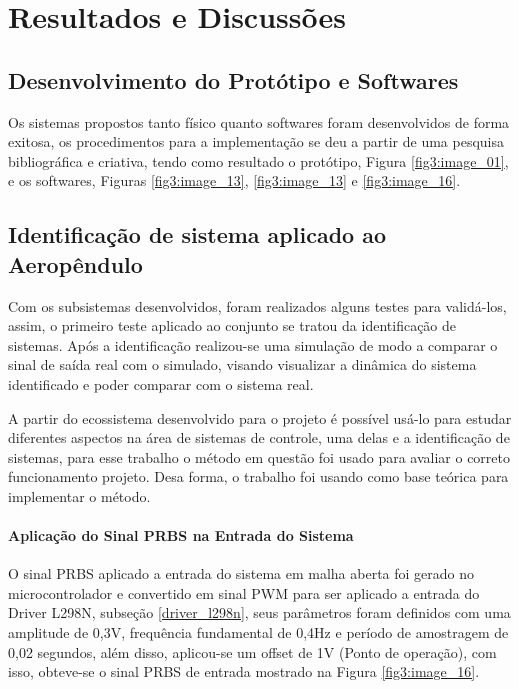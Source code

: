 \chapter{Resultados e Discussões}
\label{cap_3}

\section{Desenvolvimento do Protótipo e Softwares}

Os sistemas propostos tanto físico quanto softwares foram desenvolvidos de forma exitosa, os procedimentos para a implementação se deu a partir de uma pesquisa bibliográfica e criativa, tendo como resultado o protótipo, Figura \ref{fig3:image_01}, e os softwares, Figuras \ref{fig3:image_13}, \ref{fig3:image_13} e \ref{fig3:image_16}.


\section{Identificação de sistema aplicado ao Aeropêndulo}
\label{indentificacao}

Com os subsistemas desenvolvidos, foram realizados alguns testes para validá-los, assim, o primeiro teste aplicado ao conjunto se tratou da identificação de sistemas. Após a identificação realizou-se uma simulação de modo a comparar o sinal de saída real com o simulado, visando visualizar a dinâmica do sistema identificado e poder comparar com o sistema real.

A partir do ecossistema desenvolvido para o projeto é possível usá-lo para estudar diferentes aspectos na área de sistemas de controle, uma delas e a identificação de sistemas, para esse trabalho o método em questão foi usado para avaliar o correto funcionamento projeto. Desa forma, o trabalho \cite{tcc_klarissa_ufpa} foi usando como base teórica para implementar o método.


\subsubsection{Aplicação do Sinal PRBS na Entrada do Sistema}

O sinal PRBS aplicado a entrada do sistema em malha aberta foi gerado no microcontrolador e convertido em sinal PWM para ser aplicado a entrada do Driver L298N, subseção \ref{driver_l298n}, seus parâmetros foram definidos com uma amplitude de 0,3V, frequência fundamental de 0,4Hz e período de amostragem de 0,02 segundos, além disso, aplicou-se um offset de 1V (Ponto de operação), com isso, obteve-se o sinal PRBS de entrada mostrado na Figura \ref{fig3:image_16}.


